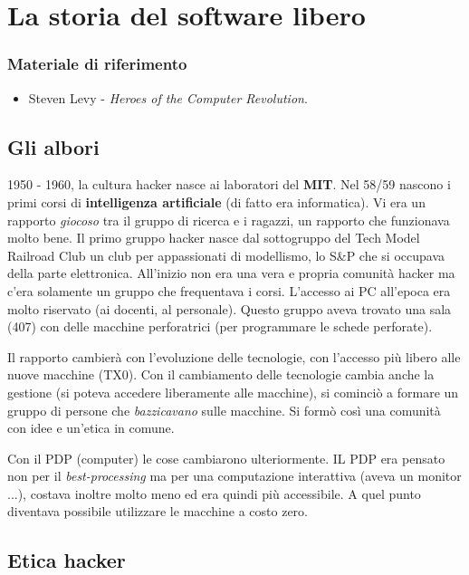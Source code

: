 \chapter{La storia del software libero}

\subsection*{Materiale di riferimento}

\begin{itemize}

\item Steven Levy - \textit{Heroes of the Computer Revolution}.

\end{itemize}

\section{Gli albori}

1950 - 1960, la cultura hacker nasce ai laboratori del \textbf{MIT}. Nel 58/59 nascono i primi corsi di \textbf{intelligenza artificiale} (di fatto era informatica). Vi era un rapporto \textit{giocoso} tra il gruppo di ricerca e i ragazzi, un rapporto che funzionava molto bene. Il primo gruppo hacker nasce dal sottogruppo del Tech Model Railroad Club un club per appassionati di modellismo, lo S\&P che si occupava della parte elettronica. All'inizio non era una vera e propria comunità hacker ma c'era solamente un gruppo che frequentava i corsi. L'accesso ai PC all'epoca era molto riservato (ai docenti, al personale). Questo gruppo aveva trovato una sala (407) con delle macchine perforatrici (per programmare le schede perforate). 

Il rapporto cambierà con l'evoluzione delle tecnologie, con l'accesso più libero alle nuove macchine (TX0). Con il cambiamento delle tecnologie cambia anche la gestione (si poteva accedere liberamente alle macchine), si cominciò a formare un gruppo di persone che \textit{bazzicavano} sulle macchine. Si formò così una comunità con idee e un'etica in comune. 

Con il PDP (computer) le cose cambiarono ulteriormente. IL PDP era pensato non per il \textit{best-processing} ma per una computazione interattiva (aveva un monitor ...), costava inoltre molto meno ed era quindi più accessibile. A quel punto diventava possibile utilizzare le macchine a costo zero.

\section{Etica hacker}

